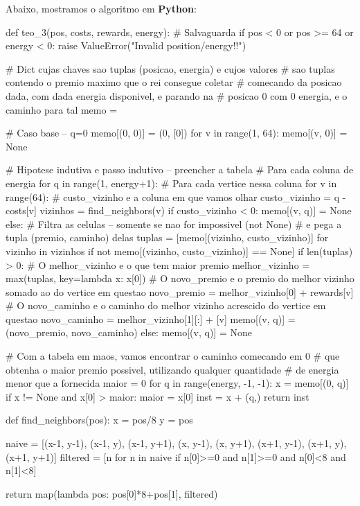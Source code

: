 \documentclass[a4paper]{article}
\begin{document}
Abaixo, mostramos o algoritmo em \textbf{Python}:

\begin{python}
def teo_3(pos, costs, rewards, energy):
  # Salvaguarda
  if pos < 0 or pos >= 64 or energy < 0:
    raise ValueError("Invalid position/energy!!")

  # Dict cujas chaves sao tuplas (posicao, energia) e cujos valores
  # sao tuplas contendo o premio maximo que o rei consegue coletar
  # comecando da posicao dada, com dada energia disponivel, e parando na
  # posicao 0 com 0 energia, e o caminho para tal
  memo = {}

  # Caso base -- q=0
  memo[(0, 0)] = (0, [0])
  for v in range(1, 64):
    memo[(v, 0)] = None

  # Hipotese indutiva e passo indutivo -- preencher a tabela
  # Para cada coluna de energia
  for q in range(1, energy+1):
    # Para cada vertice nessa coluna
    for v in range(64):
      # custo_vizinho e a coluna em que vamos olhar
      custo_vizinho = q - costs[v]
      vizinhos = find_neighbors(v)
      if custo_vizinho < 0:
        memo[(v, q)] = None
      else:
        # Filtra as celulas -- somente se nao for impossivel (not None)
        # e pega a tupla (premio, caminho) delas
        tuplas = [memo[(vizinho, custo_vizinho)] for vizinho in vizinhos if not memo[(vizinho, custo_vizinho)] == None]
        if len(tuplas) > 0:
          # O melhor_vizinho e o que tem maior premio
          melhor_vizinho = max(tuplas, key=lambda x: x[0])
          # O novo_premio e o premio do melhor vizinho somado ao do vertice em questao
          novo_premio = melhor_vizinho[0] + rewards[v]
          # O novo_caminho e o caminho do melhor vizinho acrescido do vertice em questao
          novo_caminho = melhor_vizinho[1][:] + [v]
          memo[(v, q)] = (novo_premio, novo_caminho)
        else:
          memo[(v, q)] = None

  # Com a tabela em maos, vamos encontrar o caminho comecando em 0
  # que obtenha o maior premio possivel, utilizando qualquer quantidade
  # de energia menor que a fornecida
  maior = 0
  for q in range(energy, -1, -1):
    x = memo[(0, q)]
    if x != None and x[0] > maior:
      maior = x[0]
      inst = x + (q,)
  return inst


def find_neighbors(pos):
  x = pos/8
  y = pos%

  naive = [(x-1, y-1), (x-1, y), (x-1, y+1),
           (x,   y-1),           (x,   y+1),
           (x+1, y-1), (x+1, y), (x+1, y+1)]
  filtered = [n for n in naive if n[0]>=0 and n[1]>=0 and n[0]<8 and n[1]<8]

  return map(lambda pos: pos[0]*8+pos[1], filtered)
\end{python}
\end{document}
